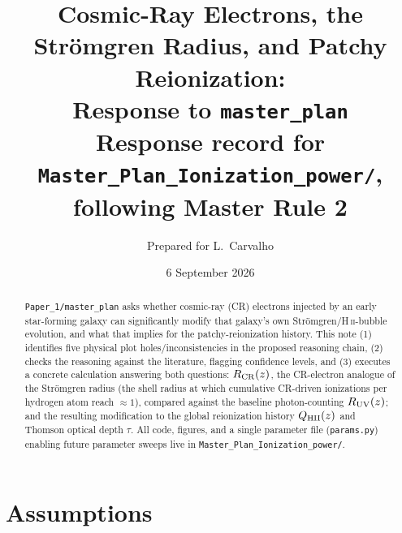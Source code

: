 \documentclass[11pt,a4paper]{article}
\title{\bf Cosmic-Ray Electrons, the Str\"omgren Radius, and Patchy Reionization:\\
Response to \texttt{master\_plan}\\[2mm]
\large Response record for \texttt{Master\_Plan\_Ionization\_power/}, following Master Rule 2}
\author{Prepared for L.\ Carvalho}
\date{6 September 2026}
\begin{document}
\maketitle

\begin{abstract}
\noindent
\texttt{Paper\_1/master\_plan} asks whether cosmic-ray (CR) electrons injected by an early
star-forming galaxy can significantly modify that galaxy's own Str\"omgren/H\,\textsc{ii}-bubble
evolution, and what that implies for the patchy-reionization history. This note (1) identifies
five physical plot holes/inconsistencies in the proposed reasoning chain, (2) checks the
reasoning against the literature, flagging confidence levels, and (3) executes a concrete
calculation answering both questions: $R_{\rm CR}(z)$, the CR-electron analogue of the
Str\"omgren radius (the shell radius at which cumulative CR-driven ionizations per hydrogen
atom reach $\approx1$), compared against the baseline photon-counting $R_{\rm UV}(z)$; and the
resulting modification to the global reionization history $Q_{\rm HII}(z)$ and Thomson optical
depth $\tau$. All code, figures, and a single parameter file (\texttt{params.py}) enabling future
parameter sweeps live in \texttt{Master\_Plan\_Ionization\_power/}.
\end{abstract}

\tableofcontents

\section{Assumptions}
\label{sec:assumptions}
\end{document}
